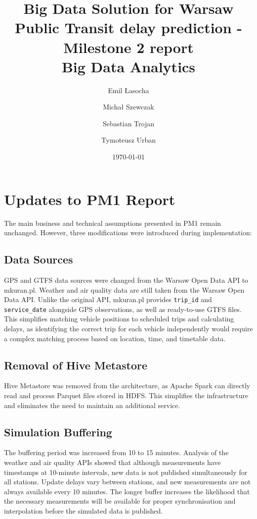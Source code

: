 \documentclass[11pt]{article}
\title{
    \textbf{Big Data Solution for Warsaw Public Transit delay prediction - Milestone 2 report} \\[0.5cm]
    \large Big Data Analytics
}
\author{Emil Łasocha \and Michał Szewczak \and Sebastian Trojan \and Tymoteusz Urban}
\date{\today}
\begin{document}
\maketitle

\section{Updates to PM1 Report}

The main business and technical assumptions presented in PM1 remain unchanged. However, three modifications were introduced during implementation:

\subsection{Data Sources}
\label{sec:updates-data-sources}

GPS and GTFS data sources were changed from the Warsaw Open Data API to mkuran.pl. Weather and air quality data are still taken from the Warsaw Open Data API. Unlike the original API, mkuran.pl provides \texttt{trip\_id} and \texttt{service\_date} alongside GPS observations, as well as ready-to-use GTFS files. This simplifies matching vehicle positions to scheduled trips and calculating delays, as identifying the correct trip for each vehicle independently would require a complex matching process based on location, time, and timetable data.

\subsection{Removal of Hive Metastore}

Hive Metastore was removed from the architecture, as Apache Spark can directly read and process Parquet files stored in HDFS. This simplifies the infrastructure and eliminates the need to maintain an additional service.

\subsection{Simulation Buffering}

The buffering period was increased from 10 to 15 minutes. Analysis of the weather and air quality APIs showed that although measurements have timestamps at 10-minute intervals, new data is not published simultaneously for all stations. Update delays vary between stations, and new measurements are not always available every 10 minutes. The longer buffer increases the likelihood that the necessary measurements will be available for proper synchronisation and interpolation before the simulated data is published.
\end{document}
